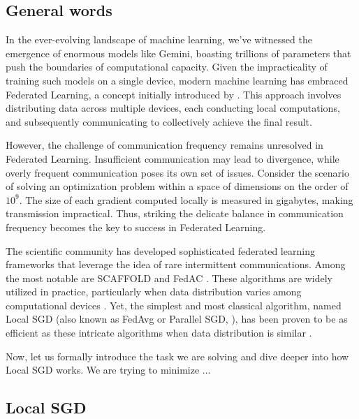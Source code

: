 $ $\par

\subsection{General words}

In the ever-evolving landscape of machine learning, we've witnessed the emergence of enormous models like Gemini, boasting trillions of parameters that push the boundaries of computational capacity. Given the impracticality of training such models on a single device, modern machine learning has embraced Federated Learning, a concept initially introduced by \cite{McMahan}. This approach involves distributing data across multiple devices, each conducting local computations, and subsequently communicating to collectively achieve the final result.

\vspace{10pt}

However, the challenge of communication frequency remains unresolved in Federated Learning. Insufficient communication may lead to divergence, while overly frequent communication poses its own set of issues. Consider the scenario of solving an optimization problem within a space of dimensions on the order of $10^9$. The size of each gradient computed locally is measured in gigabytes, making transmission impractical. Thus, striking the delicate balance in communication frequency becomes the key to success in Federated Learning.

\vspace{10pt}

The scientific community has developed sophisticated federated learning frameworks that leverage the idea of rare intermittent communications. Among the most notable are SCAFFOLD \citep{Scaffold} and FedAC \citep{FedAC}. These algorithms are widely utilized in practice, particularly when data distribution varies among computational devices \citep{Hospitals}. Yet, the simplest and most classical algorithm, named Local SGD (also known as FedAvg or Parallel SGD, \cite{Mangasarian}), has been proven to be as efficient as these intricate algorithms when data distribution is similar \citep{KEK LOL}.

Now, let us formally introduce the task we are solving and dive deeper into how Local SGD works.
We are trying to minimize ...

\vspace{10pt}

\subsection{Local SGD}


